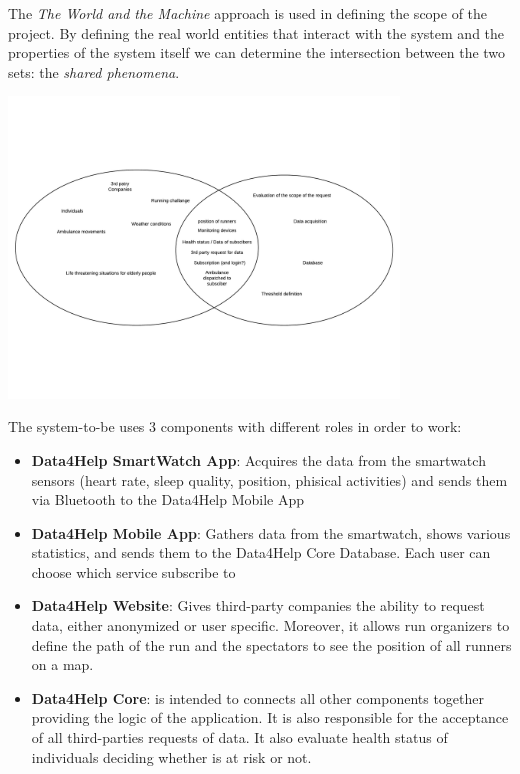 

The \textit{The World and the Machine} approach is used in defining the scope of the project.
By defining the real world entities that interact with the system and the properties of the system itself we can determine the intersection between the two sets: the \textit{shared phenomena}.
\begin{center}
    \includegraphics[height=8cm,keepaspectratio]{assets/twatm.pdf}
\end{center}

The system-to-be uses 3 components with different roles in order to work:
\begin{itemize}
    \item \textbf{Data4Help SmartWatch App}: Acquires the data from the smartwatch sensors (heart rate, sleep quality, position, phisical activities) and sends them via Bluetooth to the Data4Help Mobile App
    \item \textbf{Data4Help Mobile App}: Gathers data from the smartwatch, shows various statistics, and sends them to the Data4Help Core Database. Each user can choose which service subscribe to
    \item \textbf{Data4Help Website}: Gives third-party companies the ability to request data, either anonymized or user specific. Moreover, it allows run organizers to define the path of the run and the spectators to see the position of all runners on a map.
    \item \textbf{Data4Help Core}: is intended to connects all other components together providing the logic of the application. It is also responsible for the acceptance of all third-parties requests of data. It also evaluate health status of individuals deciding whether is at risk or not.
\end{itemize}

